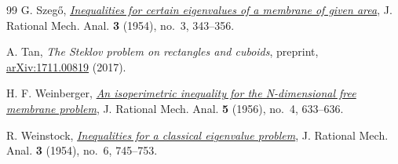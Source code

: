 \documentclass[11pt]{amsart}
\theoremstyle{remark}\newtheorem{remark}[theorem]{Remark}
\numberwithin{equation}{section}
\begin{document}
\begin{thebibliography}{99}
G. Szeg\H{o},
\href{https://doi.org/10.1512/iumj.1954.3.53017}{\emph{Inequalities for certain eigenvalues of a membrane of given area}},
J. Rational Mech. Anal. \textbf{3} (1954), no.~3, 343--356.

A. Tan,
\emph{The Steklov problem on rectangles and cuboids}, preprint,
\href{https://arxiv.org/abs/1711.00819}{arXiv:1711.00819} (2017).

H. F. Weinberger,
\href{https://doi.org/10.1512/iumj.1956.5.55021}{\emph{An isoperimetric inequality for the N-dimensional free membrane problem}},
J. Rational Mech. Anal. \textbf{5} (1956), no.~4, 633--636.

R. Weinstock,
\href{https://doi.org/10.1512/iumj.1954.3.53036}{\emph{Inequalities for a classical eigenvalue problem}},
J. Rational Mech. Anal. \textbf{3} (1954), no.~6, 745--753.

\end{thebibliography}
\end{document}
